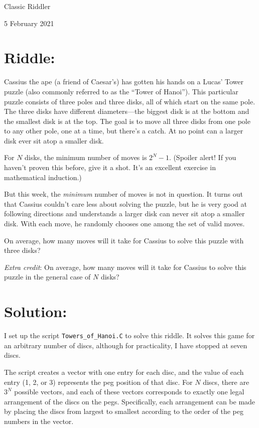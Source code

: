 \documentclass{article}
\begin{document}
\pagestyle{empty} %

\begin{center}
{\LARGE Classic Riddler}

\vspace{0.15in}

{\Large 5 February 2021}
\end{center}


\section*{Riddle:}

Cassius the ape (a friend of Caesar's) has gotten his hands on a Lucas' Tower puzzle (also commonly referred to as the ``Tower of Hanoi'').
This particular puzzle consists of three poles and three disks, all of which start on the same pole.
The three disks have different diameters---the biggest disk is at the bottom and the smallest disk is at the top.
The goal is to move all three disks from one pole to any other pole, one at a time, but there's a catch.
At no point can a larger disk ever sit atop a smaller disk.

For $N$ disks, the minimum number of moves is $2^{N}-1$.
(Spoiler alert! If you haven't proven this before, give it a shot.
It's an excellent exercise in mathematical induction.)

But this week, the \textit{minimum} number of moves is not in question.
It turns out that Cassius couldn't care less about solving the puzzle, but he is very good at following directions and understands a larger disk can never sit atop a smaller disk.
With each move, he randomly chooses one among the set of valid moves.

On average, how many moves will it take for Cassius to solve this puzzle with three disks?

\textit{Extra credit}: On average, how many moves will it take for Cassius to solve this puzzle in the general case of $N$ disks?

\section*{Solution:}

I set up the script \texttt{Towers\_of\_Hanoi.C} to solve this riddle.
It solves this game for an arbitrary number of discs, although for practicality, I have stopped at seven discs.

The script creates a vector with one entry for each disc, and the value of each entry (1, 2, or 3) represents the peg position of that disc.
For $N$ discs, there are $3^{N}$ possible vectors, and each of these vectors corresponds to exactly one legal arrangement of the discs on the pegs.
Specifically, each arrangement can be made by placing the discs from largest to smallest according to the order of the peg numbers in the vector.
\end{document}

